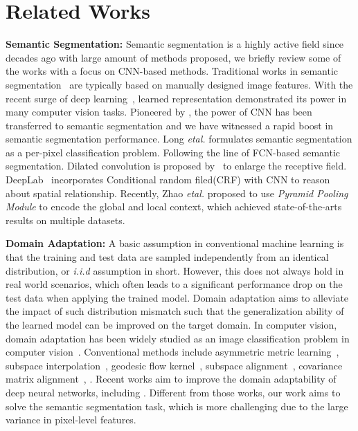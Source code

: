 \documentclass[10pt,twocolumn,letterpaper]{article}
\begin{document}
\section{Related Works}

\textbf{Semantic Segmentation:} Semantic segmentation is a highly active field since decades ago with large amount of methods proposed, we briefly review some of the works with a focus on CNN-based methods. Traditional works in semantic segmentation~\cite{shotton2008semantic,tighe2010superparsing,zhang2010semantic} are typically based on manually designed image features. With the recent surge of deep learning~\cite{krizhevsky2012imagenet}, learned representation demonstrated its power in many computer vision tasks. Pioneered by \cite{long2015fully}, the power of CNN has been transferred to semantic segmentation and we have witnessed a rapid boost in semantic segmentation performance. Long \textit{etal.}\cite{long2015fully} formulates semantic segmentation as a per-pixel classification problem. Following the line of FCN-based semantic segmentation. Dilated convolution is proposed by~\cite{yu2015multi} to enlarge the receptive field. DeepLab~\cite{chen2016deeplab} incorporates Conditional random filed(CRF) with CNN to reason about spatial relationship. Recently, Zhao \textit{etal.}\cite{zhao2016pyramid} proposed to use \textit{Pyramid Pooling Module} to encode the global and local context, which achieved state-of-the-arts results on multiple datasets. 

\textbf{Domain Adaptation:} A basic assumption in conventional machine learning is that the training and test data are sampled independently from an identical distribution, or \textit{i.i.d} assumption in short. However, this does not always hold in real world scenarios, which often leads to a significant performance drop on the test data when applying the trained model. Domain adaptation aims to alleviate the impact of such distribution mismatch such that the generalization ability of the learned model can be improved on the target domain. In computer vision, domain adaptation has been widely studied as an image classification problem in computer vision~\cite{kulis2011you,gopalan2011domain,gong2012geodesic,fernando2013unsupervised,sun2015return,long2015learning,ganin2015unsupervised,ghifary2016deep,sener2016learning,panareda2017open,motiian2017unified,li2017domain}. Conventional methods include asymmetric metric learning~\cite{kulis2011you}, subspace interpolation~\cite{gopalan2011domain}, geodesic flow kernel~\cite{gong2012geodesic}, subspace alignment~\cite{fernando2013unsupervised}, covariance matrix alignment~\cite{sun2015return}, \etc. Recent works aim to improve the domain adaptability of deep neural networks, including \cite{long2015learning,ganin2015unsupervised,ghifary2016deep,sener2016learning,panareda2017open,motiian2017unified,li2017deeper,haeusser2017associative,lu2017unsupervised,maria2017autodial}. Different from those works, our work aims to solve the semantic segmentation task, which is more challenging due to the large variance in pixel-level features. 
\end{document}
